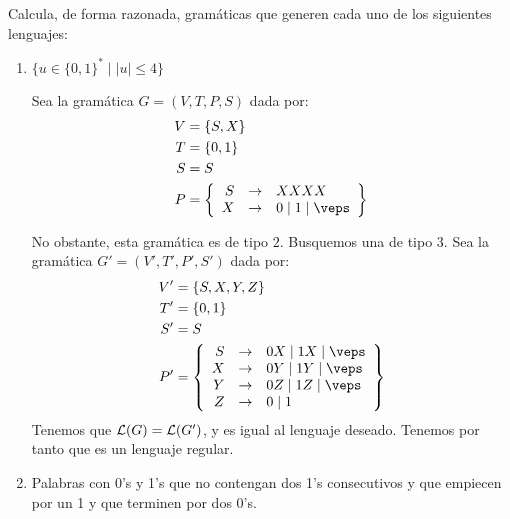 \begin{ejercicio}
    Calcula, de forma razonada, gramáticas que generen cada uno de los siguientes lenguajes:
    \begin{enumerate}
        \item $\{ u\in \{0,1\}^\ast \mid |u|\leq 4 \}$
        
        Sea la gramática $G=\left(V,T,P,S\right)$ dada por:
        \begin{align*}
            V &= \{S, X\} \\
            T &= \{0,1\} \\
            S &= S \\
            P &= \left\{
                \begin{array}{rcl}
                    S &\rightarrow & XXXX \\
                    X &\rightarrow & 0 \mid 1 \mid \veps
                \end{array}
            \right\}
        \end{align*}

        No obstante, esta gramática es de tipo $2$. Busquemos una de tipo $3$.
        Sea la gramática $G'=\left(V',T',P',S'\right)$ dada por:
        \begin{align*}
            V' &= \{S, X, Y, Z\} \\
            T' &= \{0,1\} \\
            S' &= S \\
            P' &= \left\{
                \begin{array}{rcl}
                    S &\rightarrow & 0X \mid 1X \mid \veps \\
                    X &\rightarrow & 0Y \mid 1Y \mid \veps \\
                    Y &\rightarrow & 0Z \mid 1Z \mid \veps \\
                    Z &\rightarrow & 0 \mid 1
                \end{array}
            \right\}
        \end{align*}
        Tenemos que $\mathcal{L}(G) = \mathcal{L}(G')$, y es igual al lenguaje deseado. Tenemos por tanto que es un lenguaje regular.


        \item Palabras con 0's y 1's que no contengan dos 1's consecutivos y que empiecen por un 1 y que terminen por dos 0's.
        

\end{enumerate}
\end{ejercicio}
